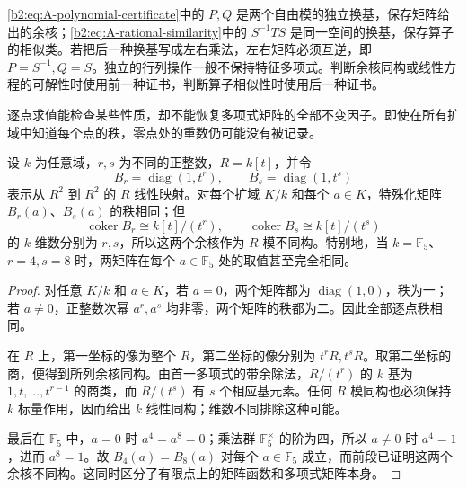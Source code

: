 \ProseParagraphBreak
\eqref{b2:eq:A-polynomial-certificate}中的 \(P,Q\) 是两个自由模的独立换基，保存矩阵给出的余核；\eqref{b2:eq:A-rational-similarity}中的 \(S^{-1}TS\) 是同一空间的换基，保存算子的相似类。若把后一种换基写成左右乘法，左右矩阵必须互逆，即 \(P=S^{-1},Q=S\)。独立的行列操作一般不保持特征多项式。判断余核同构或线性方程的可解性时使用前一种证书，判断算子相似性时使用后一种证书。

\ProseParagraphBreak
逐点求值能检查某些性质，却不能恢复多项式矩阵的全部不变因子。即使在所有扩域中知道每个点的秩，零点处的重数仍可能没有被记录。

\begin{proposition}\label{b2:prop:A-pointwise-ranks-lose-multiplicity}
	设 \(k\) 为任意域，\(r,s\) 为不同的正整数，\(R=k[t]\)，并令
	\[
		B_r=\operatorname{diag}(1,t^r),\qquad B_s=\operatorname{diag}(1,t^s)
	\]
	表示从 \(R^2\) 到 \(R^2\) 的 \(R\) 线性映射。对每个扩域 \(K/k\) 和每个 \(a\in K\)，特殊化矩阵 \(B_r(a)\)、\(B_s(a)\) 的秩相同；但
	\[
		\operatorname{coker}B_r\cong k[t]/(t^r),\qquad \operatorname{coker}B_s\cong k[t]/(t^s)
	\]
	的 \(k\) 维数分别为 \(r,s\)，所以这两个余核作为 \(R\) 模不同构。特别地，当 \(k=\mathbb F_5\)、\(r=4,s=8\) 时，两矩阵在每个 \(a\in\mathbb F_5\) 处的取值甚至完全相同。
\end{proposition}
\begin{proof}
	对任意 \(K/k\) 和 \(a\in K\)，若 \(a=0\)，两个矩阵都为 \(\operatorname{diag}(1,0)\)，秩为一；若 \(a\ne0\)，正整数次幂 \(a^r,a^s\) 均非零，两个矩阵的秩都为二。因此全部逐点秩相同。

	在 \(R\) 上，第一坐标的像为整个 \(R\)，第二坐标的像分别为 \(t^rR,t^sR\)。取第二坐标的商，便得到所列余核同构。由首一多项式的带余除法，\(R/(t^r)\) 的 \(k\) 基为 \(1,t,\ldots,t^{r-1}\) 的商类，而 \(R/(t^s)\) 有 \(s\) 个相应基元素。任何 \(R\) 模同构也必须保持 \(k\) 标量作用，因而给出 \(k\) 线性同构；维数不同排除这种可能。

	最后在 \(\mathbb F_5\) 中，\(a=0\) 时 \(a^4=a^8=0\)；乘法群 \(\mathbb F_5^\times\) 的阶为四，所以 \(a\ne0\) 时 \(a^4=1\)，进而 \(a^8=1\)。故 \(B_4(a)=B_8(a)\) 对每个 \(a\in\mathbb F_5\) 成立，而前段已证明这两个余核不同构。这同时区分了有限点上的矩阵函数和多项式矩阵本身。
\end{proof}

